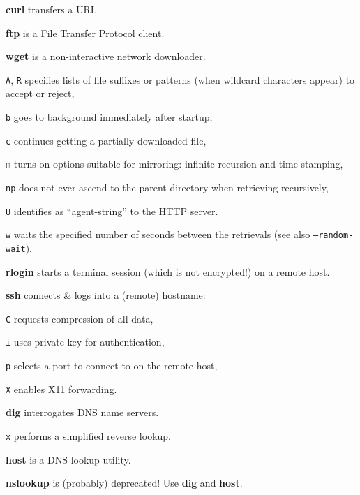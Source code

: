 \begin{compactenum}
\item [\cmdvar] \textbf{curl} transfers a URL.
\item [\cmdvar] \textbf{ftp} is a File Transfer Protocol client.
\item [\cmdvar] \textbf{wget} is a non-interactive network downloader.
\item [\texttt{A}, \texttt{R}] specifies lists 	of file suffixes or 
	patterns (when wildcard characters appear) to accept or reject,
\item [\texttt{b}] goes to background immediately after startup,
\item [\texttt{c}] continues getting a partially-downloaded file,
\item [\texttt{m}] turns on options suitable for mirroring: 
	infinite recursion and time-stamping,
\item [\texttt{np}] does not ever ascend to the
	parent directory when retrieving recursively,
\item [\texttt{U}] identifies as ``agent-string'' to the HTTP server.
\item [\texttt{w}] waits the specified number of seconds 
	between the retrievals (see also \texttt{--random-wait}).
\end{compactenum}

\begin{compactenum}
\item [\cmdvar] \textbf{rlogin} starts a terminal session (which is not encrypted!) on a remote host.
\item [\cmdvar] \textbf{ssh} connects \& logs into a (remote) hostname:
\item [\texttt{C}] requests compression of all data,
\item [\texttt{i}] uses private key for authentication,
\item [\texttt{p}] selects a port to connect to on the remote host,
\item [\texttt{X}] enables X11 forwarding.
\end{compactenum}

\begin{compactenum}
\item [\cmdvar] \textbf{dig} interrogates DNS name servers.                        
\item [\texttt{x}] performs a simplified reverse lookup. 
\item [\cmdvar] \textbf{host} is a DNS lookup utility.  
\item [\cmdvar] \textbf{nslookup} is (probably) deprecated! Use \textbf{dig} and \textbf{host}.
\end{compactenum}

